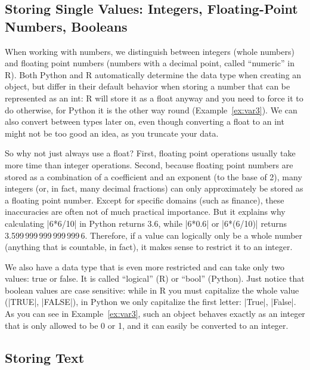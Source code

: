 



\subsection{Storing Single Values: Integers, Floating-Point Numbers, Booleans}

 When working with numbers, we distinguish between integers (whole
numbers) and floating point numbers (numbers with a decimal point,
called ``numeric'' in R). Both Python and R automatically determine the
data type when creating an object, but differ in their default
behavior when storing a number that can be represented as an int: R
will store it as a float anyway and you need to force it to do
otherwise, for Python it is the other way round
(Example~\ref{ex:var3}). We can also convert between types later on,
even though converting a float to an int might not be too good an idea,
as you truncate your data.

So why not just always use a float? First,
floating point operations usually take more time than integer operations.
Second, because floating point numbers are stored as a combination of
a coefficient and an exponent (to the base of 2), many integers (or,
in fact, many decimal fractions) can only approximately be stored
as a floating point number. Except for specific domains (such
as finance), these inaccuracies are often not of much practical importance.
But it explains why calculating |6*6/10| in Python returns 3.6, while
|6*0.6| or |6*(6/10)| returns 3.599\,999\,999\,999\,999\,6. Therefore, if
a value can logically only be a whole number (anything that is
countable, in fact), it makes sense to restrict it to an integer.

We also have a data type that is even more restricted and can take
only two values: true or false. It is called ``logical'' (R) or ``bool''
(Python).  Just notice that boolean values are case sensitive:
while in R you must capitalize the whole value (|TRUE|, |FALSE|), in
Python we only capitalize the first letter: |True|, |False|.  As you can
see in Example~\ref{ex:var3}, such an object behaves exactly as an integer that
is only allowed to be 0 or 1, and it can easily be converted to an
integer.





\subsection{Storing Text}

